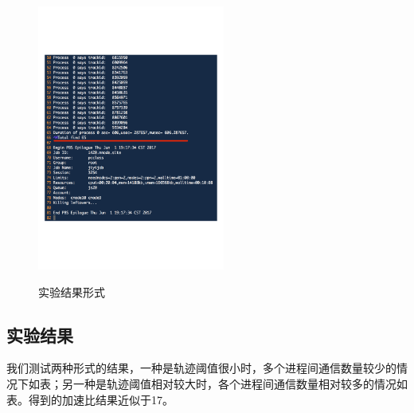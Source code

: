 \documentclass[UTF8]{ctexart}
\begin{document}
\begin{figure}[!htbp]
  \centering
  \includegraphics[width=0.55\textwidth]{fig/fig05.pdf}\\
  \caption{实验结果形式}
  \label{sec4:subsec2:fg1}
\end{figure}

\subsection{实验结果}
\label{sec4:subsec3}

我们测试两种形式的结果，一种是轨迹阈值很小时，多个进程间通信数量较少的情况下如表；另一种是轨迹阈值相对较大时，各个进程间通信数量相对较多的情况如表。得到的加速比结果近似于17。
\end{document}
